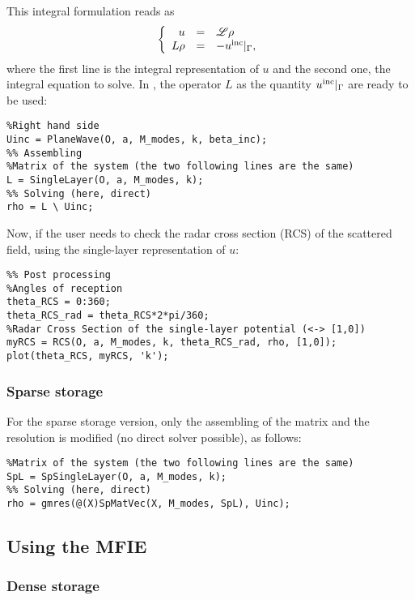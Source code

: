 This integral formulation reads as
$$
\left\{\begin{array}{r c l}
u &=& {\mathscr L}\rho\\
L\rho &=& -u^{\textrm{inc}}|_{\Gamma},
\end{array}\right.
$$
where the first line is the integral representation of $u$ and the second one, the integral equation to solve. In \mudiff, the operator $L$ as the quantity $u^{\textrm{inc}}|_{\Gamma}$ are ready to be used:
\begin{lstlisting}
%Right hand side
Uinc = PlaneWave(O, a, M_modes, k, beta_inc);
%% Assembling
%Matrix of the system (the two following lines are the same)
L = SingleLayer(O, a, M_modes, k);
%% Solving (here, direct)
rho = L \ Uinc;
\end{lstlisting}

Now, if the user needs to check the radar cross section (RCS) of the scattered field, using the single-layer representation of $u$:
\begin{lstlisting}
%% Post processing
%Angles of reception
theta_RCS = 0:360;
theta_RCS_rad = theta_RCS*2*pi/360;
%Radar Cross Section of the single-layer potential (<-> [1,0])
myRCS = RCS(O, a, M_modes, k, theta_RCS_rad, rho, [1,0]);
plot(theta_RCS, myRCS, 'k');
\end{lstlisting}

\subsubsection{Sparse storage}

For the sparse storage version, only the assembling of the matrix and the resolution is modified (no direct solver possible), as follows:
\begin{lstlisting}
%Matrix of the system (the two following lines are the same)
SpL = SpSingleLayer(O, a, M_modes, k);
%% Solving (here, direct)
rho = gmres(@(X)SpMatVec(X, M_modes, SpL), Uinc);
\end{lstlisting}

\subsection{Using the MFIE}

\subsubsection{Dense storage}

